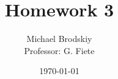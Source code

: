 


\title{Homework 3}
\date{\today}
\author{Michael Brodskiy\\ \small Professor: G. Fiete}



\maketitle

